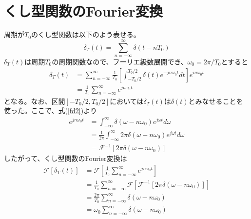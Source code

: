\documentclass[]{jlreq}
\begin{document}
\section{くし型関数のFourier変換}
周期が$T_0$のくし型関数は以下のよう表せる。
%
\begin{equation}
  \delta_T (t) = \sum_{n=-\infty}^{\infty} \delta (t - n T_0 )
\end{equation}
%
$\delta_T (t)$は周期$T_0$の周期関数なので、フーリエ級数展開でき、$\omega_0 = 2\pi / T_0$とすると
%
\begin{align}
  \delta_T(t) &= \sum_{n = -\infty}^{\infty} \frac{1}{T_0} \left[\int_{-T_0/2}^{T_0/2}\delta (t) e^{-j n \omega_0 t} dt\right] 
  e^{i n \omega_0 t} \\
              &= \frac{1}{T_0} \sum_{n = -\infty}^{\infty} e^{j n \omega_0 t} 
\end{align}
%
となる。なお、区間$[-T_0/2, T_0/2]$においては$\delta_T(t)$は$\delta(t)$とみなせることを使った。ここで、式(\ref{fd2})より
%
\begin{align}
  e^{j n \omega_0 t} &=  \int_{-\infty}^{\infty} \delta (\omega - n \omega_0) e^{j \omega t} d\omega \\ 
      &= \frac{1}{2\pi} \int_{-\infty}^{\infty} 2\pi \delta (\omega - n \omega_0) e^{j \omega t} d\omega \\ 
      &= \mathcal{F}^{-1}[2\pi \delta(\omega - n\omega_0)] 
\end{align}
%
したがって、くし型関数のFourier変換は
%
\begin{align}
  \mathcal{F}[\delta_T(t)] &= \mathcal{F}\left[\frac{1}{T_0} \sum_{n = -\infty}^{\infty} e^{j n \omega_0 t}\right] \\ 
      & = \frac{1}{T_0} \sum_{n = -\infty}^{\infty} \mathcal{F}[\mathcal{F}^{-1}[2\pi \delta(\omega - n\omega_0)]] \\ 
      & = \frac{2 \pi}{T_0} \sum_{n = -\infty}^{\infty} \delta(\omega - n\omega_0)\\ 
      &= \omega_0 \sum_{n = -\infty}^{\infty} \delta(\omega - n\omega_0)
\end{align}
%
\end{document}
